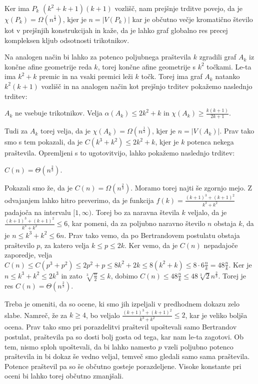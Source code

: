 \documentclass[mat1, tisk]{fmfdelo}
\begin{document}
Ker ima $P_k$ $(k^2 + k + 1)(k + 1)$ vozlišč, nam prejšnje trditve povejo, da je $\chi(P_k) = \Omega(n^{\frac{1}{3}})$, kjer je $n = |V(P_k)|$ kar je občutno večje kromatično število kot v prejšnjih konstrukcijah in kaže, da je lahko graf globalno res precej kompleksen
kljub odsotnosti trikotnikov.

Na analogen način bi lahko za potenco poljubnega praštevila $k$ zgradili graf $A_k$ iz končne afine geometrije reda $k$, torej končne afine geometrije s $k^2$ točkami. Le-ta ima $k^2 + k$ premic in na vsaki premici leži $k$ točk. Torej ima graf $A_k$ natanko $k^2(k + 1)$ vozlišč in na analogen način kot prejšnjo
trditev pokažemo naslednjo trditev:

    \begin{trditev}
        $A_k$ ne vsebuje trikotnikov. Velja $\alpha(A_k) \leq 2 k^2 + k$ in $\chi(A_k) \geq \frac{k(k + 1)}{2k + 1}$.
    \end{trditev}

Tudi za $A_k$ torej velja, da je $\chi(A_k) = \Omega(n^{\frac{1}{3}})$, kjer je $n = |V(A_k)|$. Prav tako smo s tem pokazali, da je $C(k^3 + k^2) \leq 2k^2 + k$, kjer je $k$ potenca nekega praštevila. Opremljeni s to ugotovitvijo, lahko pokažemo naslednjo trditev:

    \begin{trditev}
        $C(n) = \Theta(n^{\frac{2}{3}})$.
    \end{trditev}

    \begin{dokaz}
        Pokazali smo že, da je $C(n) = \Omega(n^{\frac{2}{3}})$. Moramo torej najti še zgornjo mejo. Z odvajanjem lahko hitro preverimo, da je funkcija $f(k) = \frac{(k+1)^3 + (k+1)^2}{k^3+k^2}$ padajoča na intervalu $[1,\infty)$. Torej bo za naravna števila $k$ veljalo,
        da je $\frac{(k+1)^3 + (k+1)^2}{k^3+k^2} \leq 6$, kar pomeni, da za poljubno naravno število $n$ obstaja $k$, da je $n \leq k^3 + k^2 \leq 6n$. Prav tako vemo, da po Bertrandovem postulatu obstaja praštevilo $p$, za katero velja $k \leq p \leq 2k$. Ker vemo, da je
        $C(n)$ nepadajoče zaporedje, velja $C(n) \leq C(p^3 + p^2) \leq 2p^2 + p \leq 8k^2 + 2k \leq 8(k^2 + k) \leq 8\cdot 6\frac{n}{k} = 48\frac{n}{k}$. Ker je $n \leq k^3 + k^2 \leq 2k^3$ in zato $\sqrt[3]{\frac{n}{2}} \leq k$, dobimo $C(n) \leq 48\frac{n}{k} \leq 48\sqrt[3]{2}n^{\frac{2}{3}}$.
        Torej je res $C(n) = \Theta(n^{\frac{2}{3}})$.
    \end{dokaz}

Treba je omeniti, da so ocene, ki smo jih izpeljali v predhodnem dokazu zelo slabe. Namreč, že za $k \geq 4$, bo veljalo $\frac{(k+1)^3 + (k+1)^2}{k^3+k^2} \leq 2$, kar je veliko boljša ocena. Prav tako smo pri porazdelitvi praštevil upoštevali samo Bertrandov postulat,
praštevila pa so dosti bolj gosta od tega, kar nam le-ta zagotovi. Ob tem, nismo sploh upoštevali, da bi lahko namesto $p$ vzeli poljubno potenco praštevila in bi dokaz še vedno veljal, temveč smo gledali samo sama praštevila. Potence praštevil pa so še občutno
gosteje porazdeljene. Visoke konstante pri oceni bi lahko torej občutno zmanjšali.
\end{document}
